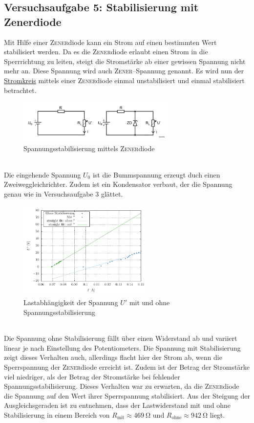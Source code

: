 \documentclass[a4paper,10pt]{article}
\numberwithin{equation}{section}
\begin{document}
\subsection{Versuchsaufgabe 5: Stabilisierung mit Zenerdiode}
Mit Hilfe einer \textsc{Zener}diode kann ein Strom auf einen bestimmten Wert stabilisiert werden.
Da es die \textsc{Zener}diode erlaubt einen Strom in die Sperrrichtung zu leiten, steigt die Stromstärke ab einer gewissen Spannung nicht mehr an.
Diese Spannung wird auch \textsc{Zener}--Spannung genannt.
Es wird nun der \hyperref[fig:stromkreise_zener]{Stromkreis} mittels einer \textsc{Zener}diode einmal unstabilisiert und einmal stabilisiert betrachtet.
\begin{figure}[h]
        \centering
        \includegraphics[width=0.7\textwidth]{spannungsstabilisierung.png}
        \caption{Spannungsstabilisierung mittels \textsc{Zener}diode} \label{fig:stromkreise_zener}
\end{figure}\\
Die eingehende Spannung $U_0$ ist die Bummspannung erzeugt duch einen Zweiweggleichrichter.
Zudem ist ein Kondensator verbaut, der die Spannung genau wie in Versuchsaufgabe 3 glättet.
\begin{figure}[h]
        \centering
        \includegraphics[width=0.6\textwidth]{plot/5_beides_crop.pdf}
        \caption{Lastabhängigkeit der Spannung $U'$ mit und ohne Spannungsstabilisierung}
\end{figure}\\
Die Spannung ohne Stabilisierung fällt über einen Widerstand ab und variiert linear je nach Einstellung des Potentiometers.
Die Spannung mit Stabilisierung zeigt dieses Verhalten auch, allerdings flacht hier der Strom ab, wenn die Sperrspannung der \textsc{Zener}diode erreicht ist.
Zudem ist der Betrag der Stromstärke viel niedriger, als der Betrag der Stromstärke bei fehlender Spannungsstabilisierung.
Dieses Verhalten war zu erwarten, da die \textsc{Zener}diode die Spannung auf den Wert ihrer Sperrspannung stabilisiert.
Aus der Steigung der Ausgleichsgeraden ist zu entnehmen, dass der Lastwiderstand mit und ohne Stabilisierung in einem Bereich von $R_\text{mit} \approx \SI{469}{\ohm}$ und $R_\text{ohne} \approx \SI{942}{\ohm}$ liegt.
\clearpage
\end{document}
